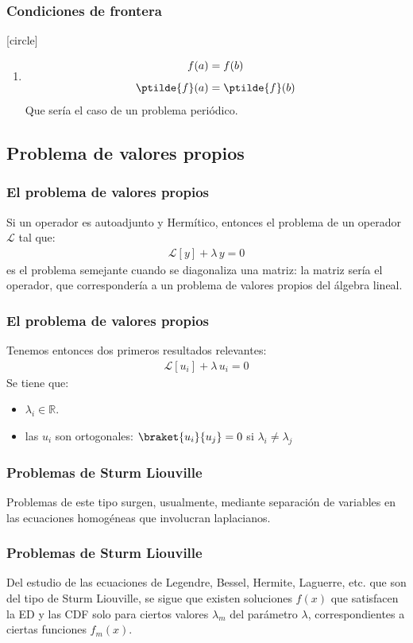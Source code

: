 \begin{frame}
\frametitle{Condiciones de frontera}
[circle]
\begin{enumerate}[<+->]
\conti
\item 
\begin{align*}
f(a) &= f(b) \\[0.5em]
\ptilde{f}(a) &= \ptilde{f}(b)
\end{align*}
Que sería el caso de un problema periódico.
\end{enumerate}
\end{frame}
\subsection{Problema de valores propios}
\begin{frame}
\frametitle{El problema de valores propios}
Si un operador es autoadjunto y Hermítico, entonces el problema de un operador $\mathcal{L}$ tal que:
\begin{align*}
\mathcal{L} [y] + \lambda \, y = 0
\end{align*}
es el problema semejante cuando se diagonaliza una matriz: la matriz sería el operador, que correspondería a un problema de valores propios del álgebra lineal.
\end{frame}
\begin{frame}
\frametitle{El problema de valores propios}
Tenemos entonces dos primeros resultados relevantes:
\begin{align*}
\mathcal{L} [u_{i}] + \lambda \, u_{i} = 0
\end{align*}
Se tiene que:
\begin{itemize}[<+->]
\item $\lambda_{i} \in \mathbb{R}$.
\item las $u_{i}$ son ortogonales: $\braket{u_{i}}{u_{j}} = 0$ si $\lambda_{i} \neq \lambda_{j}$
\end{itemize}
\end{frame}
\begin{frame}
\frametitle{Problemas de Sturm Liouville}
Problemas de este tipo surgen, usualmente, mediante separación de variables en las ecuaciones homogéneas que involucran laplacianos.
\end{frame}
\begin{frame}
\frametitle{Problemas de Sturm Liouville}
Del estudio de las ecuaciones de Legendre, Bessel, Hermite, Laguerre, etc. que son del tipo de Sturm Liouville, se sigue que existen soluciones $f(x)$ que satisfacen la ED y las CDF solo para ciertos valores $\lambda_{m}$ del parámetro $\lambda$, correspondientes a ciertas funciones $f_{m}(x)$.
\end{frame}
